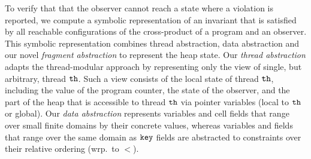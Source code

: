
To verify that that the observer cannot reach a state where a violation
is reported, we compute a symbolic representation
of an invariant that is satisfied by all reachable configurations of
the cross-product of a program  and an observer.
This symbolic representation combines thread abstraction, data abstraction
and our novel {\em fragment abstraction} to represent the heap state.
Our {\em thread abstraction} adapts the thread-modular approach by representing only the view of single, but arbitrary, thread ${\tt th}$. Such a view consists of
the local state of thread ${\tt th}$, including the value of the program counter,
the state of the observer, and
the part of the heap that is accessible to thread ${\tt th}$ via pointer variables (local to ${\tt th}$ or global).
Our {\em data abstraction} represents variables and cell
fields that range over small finite domains by their concrete values,
whereas variables and fields that range over the same domain as $\tt key$
fields are abstracted to constraints over their relative ordering (wrp.\ to $<$).

